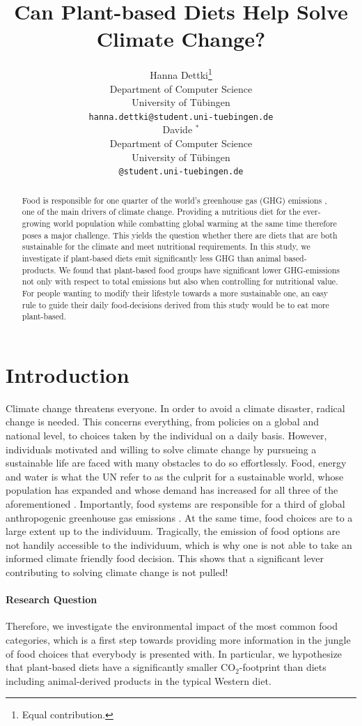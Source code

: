\documentclass{article}
\title{Can Plant-based Diets Help Solve Climate Change?}
\author{%
  Hanna Dettki\thanks{Equal contribution.} \\
  Department of Computer Science\\
  University of Tübingen\\
  \texttt{hanna.dettki@student.uni-tuebingen.de} \\
  \And
  Davide $^{*}$  \\
  Department of Computer Science\\
  University of Tübingen\\
  \texttt{@student.uni-tuebingen.de} \\
}
\begin{document}
\maketitle

\begin{abstract}
  Food is responsible for one quarter of the world's greenhouse gas (GHG) emissions \cite{Poore2018}, one of the main drivers of climate change. Providing a nutritious diet for the ever-growing world population while combatting global warming at the same time therefore poses a major challenge. This yields the question whether there are diets that are both sustainable for the climate and meet  nutritional requirements. In this study, we investigate if plant-based diets  emit significantly less GHG than animal based-products. We found  that plant-based food groups have significant lower GHG-emissions not only with respect to total emissions but also when controlling for nutritional value. For people wanting to  modify their lifestyle towards a more sustainable one, an easy rule to guide their daily food-decisions derived from this study would be to eat more plant-based.
\end{abstract}

\section{Introduction}

Climate change threatens everyone. In order to avoid a climate disaster, radical change is needed. This concerns everything, from policies on a global and national level, to choices taken by the individual on a daily basis. 
However, individuals motivated and willing to solve climate change by pursueing a sustainable life are faced with many obstacles to do so effortlessly. Food, energy and water is what the UN refer to as the culprit for a sustainable world, whose population has expanded and whose demand has increased for all three of the aforementioned  \cite{Ritchie2020}.
 Importantly, food systems are responsible for a third of global anthropogenic greenhouse gas emissions \cite{Crippa2021}. At the same time, food choices are to a large extent up to the individuum.  Tragically,  the emission of food options are not handily accessible to the individuum, which is why one is not able to take an informed climate friendly food decision. This shows that a significant lever contributing to solving climate change is not pulled!
\paragraph*{Research Question}
Therefore, we investigate the environmental impact of the most common food categories, which is a first step towards  providing more information in the jungle of food choices that everybody is presented with. In particular, we hypothesize that  plant-based diets  have a significantly smaller CO$_2$-footprint than  diets including animal-derived products in the typical Western diet.
\end{document}
